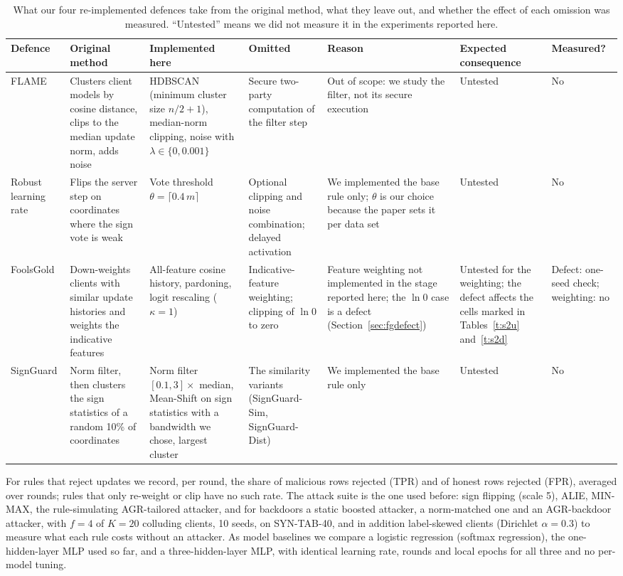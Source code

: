 \documentclass[conference]{IEEEtran}
\begin{document}
\begin{table}[t]\centering\caption{What our four re-implemented defences take from the original method, what they leave out, and whether the effect of each omission was measured. ``Untested'' means we did not measure it in the experiments reported here.}\label{t:impl}\scriptsize\setlength{\tabcolsep}{3pt}
\begin{tabular}{p{1.5cm}p{2.9cm}p{3.1cm}p{2.7cm}p{3.0cm}p{2.0cm}p{1.2cm}}\toprule
Defence & Original method & Implemented here & Omitted & Reason & Expected consequence & Measured?\\\midrule
FLAME & Clusters client models by cosine distance, clips to the median update norm, adds noise & HDBSCAN (minimum cluster size $n/2+1$), median-norm clipping, noise with $\lambda\in\{0,0.001\}$ & Secure two-party computation of the filter step & Out of scope: we study the filter, not its secure execution & Untested & No\\
Robust learning rate & Flips the server step on coordinates where the sign vote is weak & Vote threshold $\theta=\lceil 0.4\,m\rceil$ & Optional clipping and noise combination; delayed activation & We implemented the base rule only; $\theta$ is our choice because the paper sets it per data set & Untested & No\\
FoolsGold & Down-weights clients with similar update histories and weights the indicative features & All-feature cosine history, pardoning, logit rescaling ($\kappa=1$) & Indicative-feature weighting; clipping of $\ln 0$ to zero & Feature weighting not implemented in the stage reported here; the $\ln 0$ case is a defect (Section~\ref{sec:fgdefect}) & Untested for the weighting; the defect affects the cells marked in Tables~\ref{t:s2u} and~\ref{t:s2d} & Defect: one-seed check; weighting: no\\
SignGuard & Norm filter, then clusters the sign statistics of a random 10\% of coordinates & Norm filter $[0.1,3]\times$ median, Mean-Shift on sign statistics with a bandwidth we chose, largest cluster & The similarity variants (SignGuard-Sim, SignGuard-Dist) & We implemented the base rule only & Untested & No\\\bottomrule\end{tabular}\end{table}
For rules that reject updates we record, per round, the share of malicious rows rejected (TPR) and of honest rows rejected (FPR), averaged over rounds; rules that only re-weight or clip have no such rate. The attack suite is the one used before: sign flipping (scale 5), ALIE, MIN-MAX, the rule-simulating AGR-tailored attacker, and for backdoors a static boosted attacker, a norm-matched one and an AGR-backdoor attacker, with $f=4$ of $K=20$ colluding clients, 10 seeds, on SYN-TAB-40, and in addition label-skewed clients (Dirichlet $\alpha=0.3$) to measure what each rule costs without an attacker. As model baselines we compare a logistic regression (softmax regression), the one-hidden-layer MLP used so far, and a three-hidden-layer MLP, with identical learning rate, rounds and local epochs for all three and no per-model tuning.
\end{document}
